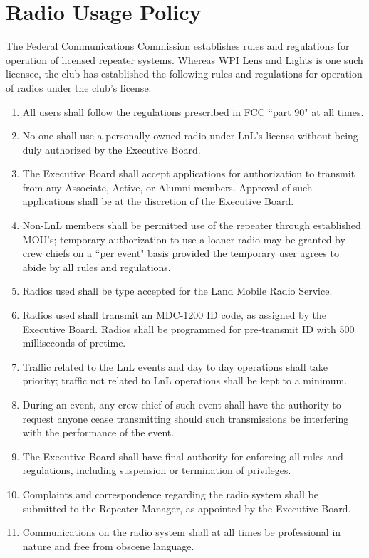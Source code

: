 \documentclass[12pt,letterpaper,oneside]{book}
\begin{document}
\chapter{Radio Usage Policy}

The Federal Communications Commission establishes rules and regulations for operation of licensed repeater systems. Whereas WPI Lens and Lights is one such licensee, the club has established the following rules and regulations for operation of radios under the club's license:

\begin{enumerate}

\item All users shall follow the regulations prescribed in FCC ``part 90" at all times.
\item No one shall use a personally owned radio under LnL's license without being duly authorized by the Executive Board.
\item The Executive Board shall accept applications for authorization to transmit from any Associate, Active, or Alumni members. Approval of such applications shall be at the discretion of the Executive Board.
\item Non-LnL members shall be permitted use of the repeater through established MOU's; temporary authorization to use a loaner radio may be granted by crew chiefs on a ``per event" basis provided the temporary user agrees to abide by all rules and regulations.
\item Radios used shall be type accepted for the Land Mobile Radio Service.
\item Radios used shall transmit an MDC-1200 ID code, as assigned by the Executive Board. Radios shall be programmed for pre-transmit ID with 500 milliseconds of pretime.
\item Traffic related to the LnL events and day to day operations shall take priority; traffic not related to LnL operations shall be kept to a minimum.
\item During an event, any crew chief of such event shall have the authority to request anyone cease transmitting should such transmissions be interfering with the performance of the event.
\item The Executive Board shall have final authority for enforcing all rules and regulations, including suspension or termination of privileges.
\item Complaints and correspondence regarding the radio system shall be submitted to the Repeater Manager, as appointed by the Executive Board.
\item Communications on the radio system shall at all times be professional in nature and free from obscene language.

\end{enumerate}
\end{document}

